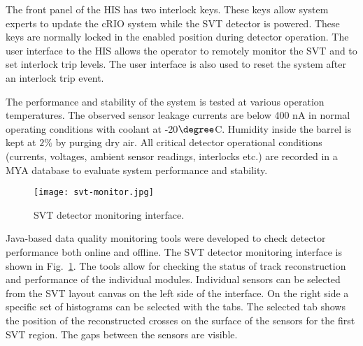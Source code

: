 The front panel of the HIS has two interlock keys. These keys allow system experts to update the cRIO system while the SVT detector is powered. These keys are normally locked in the enabled position during detector operation.
The user interface to the HIS allows the operator to remotely monitor the SVT and to set interlock trip levels. The user interface is also used to reset the system after an interlock trip event. 


The performance and stability of the system is tested at various operation temperatures. The observed sensor leakage currents are below 400 nA in normal operating conditions with coolant at -20$\degree$C. Humidity inside the barrel is kept at $2\%$ by purging dry air. All critical detector operational conditions (currents, voltages, ambient sensor readings, interlocks etc.) are recorded in a MYA database \cite{MYA} to evaluate system performance and stability. %

\begin{figure}[hbt] 
\centering 
\texttt{[image: svt-monitor.jpg]}
\caption{SVT detector monitoring interface.}
\label{fig:svt-monitor}
\end{figure}

Java-based data quality monitoring tools were developed to check detector performance both online and offline. The SVT detector monitoring interface is shown in Fig.~\ref{fig:svt-monitor}. The tools allow for checking the status of track reconstruction and performance of the individual modules. Individual sensors can be selected from the SVT layout canvas on the left side of the interface. On the right side a specific set of histograms can be selected with the tabs. The selected tab shows the position of the reconstructed crosses on the surface of the sensors for the first SVT region. The gaps between the sensors are visible.

